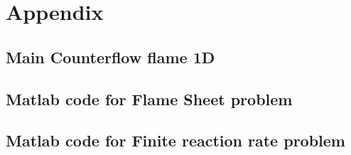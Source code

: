 \chapter{Appendix}	\label{ch:appendix}
\section{Main Counterflow flame 1D}

\section{Matlab code for Flame Sheet problem}

\section{Matlab code for Finite reaction rate problem}

